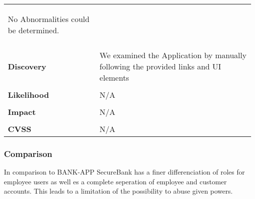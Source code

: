 \begin{longtable*}{p{.20\textwidth} | p{.80\textwidth}}
\begin{center}
		\end{center}
		No Abnormalities could be determined.
    \\\\
    \textbf{Discovery} &
    	We examined the Application by manually following the provided links and UI elements
    \\\\
    \textbf{Likelihood} &
    	N/A
    \\\\
    \textbf{Impact} &
    	N/A
    \\\\
    \textbf{CVSS} &
    	N/A
    \\
    \hline
\end{longtable*}
\subsubsection{Comparison}
In comparison to BANK-APP SecureBank has a finer differenciation of roles for employee users as well es a complete seperation of employee and customer accounts. This leads to a limitation of the possibility to abuse given powers.
\clearpage